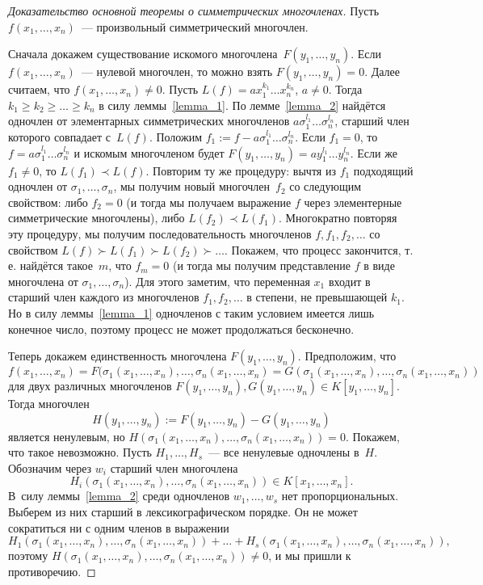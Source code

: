 \documentclass[a4paper,10pt]{amsart}
\theoremstyle{definition}
\theoremstyle{remark}
\begin{document}
\begin{proof}[Доказательство основной теоремы о симметрических многочленах]
Пусть $f(x_1, \ldots, x_n)$~--- произвольный симметрический
многочлен.

Сначала докажем существование искомого многочлена~$F(y_1, \ldots,
y_n)$. Если $f(x_1, \ldots, x_n)$~--- нулевой многочлен, то можно
взять $F(y_1,\ldots, y_n) = 0$. Далее считаем, что $f(x_1, \ldots,
x_n) \ne 0$. Пусть $L(f) = ax_1^{k_1} \ldots x_n^{k_n}$, $a \ne 0$.
Тогда $k_1 \geqslant k_2 \geqslant \ldots \geqslant k_n$ в силу
леммы~\ref{lemma_1}. По лемме~\ref{lemma_2} найдётся одночлен от
элементарных симметрических многочленов
$a\sigma_1^{l_1}\ldots\sigma_n^{l_n}$, старший член которого
совпадает с~$L(f)$. Положим $f_1 := f -
a\sigma_1^{l_1}\ldots\sigma_n^{l_n}$. Если $f_1 = 0$, то $f = a
\sigma_1^{l_1} \ldots \sigma_n^{l_n}$ и искомым многочленом будет
$F(y_1, \ldots, y_n) = ay_1^{l_1} \ldots y_n^{l_n}$. Если же $f_1
\ne 0$, то $L(f_1) \prec L(f)$. Повторим ту же процедуру: вычтя из
$f_1$ подходящий одночлен от $\sigma_1, \ldots, \sigma_n$, мы
получим новый многочлен~$f_2$ со следующим свойством: либо $f_2 = 0$
(и тогда мы получаем выражение $f$ через элементерные симметрические
многочлены), либо $L(f_2) \prec L(f_1)$. Многократно повторяя эту
процедуру, мы получим последовательность многочленов $f, f_1, f_2,
\ldots$ со свойством $L(f) \succ L(f_1) \succ L(f_2) \succ \ldots$.
Покажем, что процесс закончится, т.\,е. найдётся такое~$m$, что $f_m
= 0$ (и тогда мы получим представление $f$ в виде многочлена от
$\sigma_1, \ldots, \sigma_n$). Для этого заметим, что переменная
$x_1$ входит в старший член каждого из многочленов $f_1, f_2,
\ldots$ в степени, не превышающей $k_1$. Но в силу
леммы~\ref{lemma_1} одночленов с таким условием имеется лишь
конечное число, поэтому процесс не может продолжаться бесконечно.

Теперь докажем единственность многочлена $F(y_1, \ldots, y_n)$.
Предположим, что
$$
f(x_1, \ldots, x_n) = F(\sigma_1(x_1, \ldots, x_n), \ldots,
\sigma_n(x_1, \ldots, x_n) = G(\sigma_1(x_1, \ldots, x_n), \ldots,
\sigma_n(x_1, \ldots, x_n))
$$
для двух различных многочленов $F(y_1, \ldots, y_n), G(y_1, \ldots,
y_n) \in K[y_1, \ldots, y_n]$. Тогда многочлен $$H(y_1, \ldots, y_n)
:= F(y_1, \ldots, y_n) - G(y_1, \ldots, y_n)$$ является ненулевым,
но $H(\sigma_1(x_1, \ldots, x_n), \ldots, \sigma_n(x_1, \ldots,
x_n)) = 0$. Покажем, что такое невозможно. Пусть $H_1, \ldots,
H_s$~--- все ненулевые одночлены в~$H$. Обозначим через $w_i$
старший член многочлена $$H_i(\sigma_1(x_1, \ldots, x_n), \ldots,
\sigma_n(x_1, \ldots, x_n)) \in K[x_1, \ldots, x_n].$$ В~силу
леммы~\ref{lemma_2} среди одночленов $w_1, \ldots, w_s$ нет
пропорциональных. Выберем из них старший в лексикографическом
порядке. Он не может сократиться ни с одним членов в выражении
$$
H_1(\sigma_1(x_1, \ldots, x_n), \ldots, \sigma_n(x_1, \ldots, x_n))
+ \ldots + H_s(\sigma_1(x_1, \ldots, x_n), \ldots, \sigma_n(x_1,
\ldots, x_n)),
$$
поэтому $H(\sigma_1(x_1, \ldots, x_n), \ldots, \sigma_n(x_1, \ldots,
x_n)) \ne 0$, и мы пришли к противоречию.
\end{proof}
\end{document}
